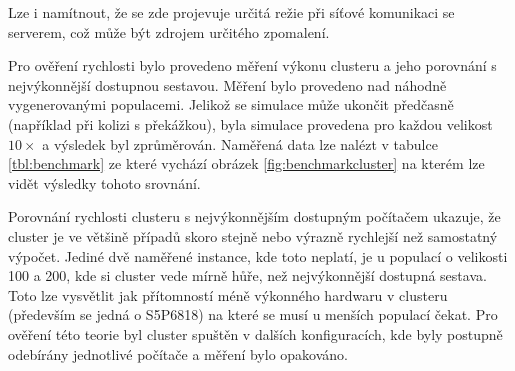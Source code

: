 Lze i namítnout, že se zde projevuje určitá režie při síťové komunikaci se serverem, což může být zdrojem určitého zpomalení.

Pro ověření rychlosti bylo provedeno měření výkonu clusteru a jeho porovnání s nejvýkonnější dostupnou sestavou. Měření bylo provedeno nad náhodně vygenerovanými populacemi. Jelikož se simulace může ukončit předčasně (například při kolizi s překážkou), byla simulace provedena pro každou velikost $10\times$ a výsledek byl zprůměrován. Naměřená data lze nalézt v tabulce \ref{tbl:benchmark} ze které vychází obrázek \ref{fig:benchmarkcluster} na kterém lze vidět výsledky tohoto srovnání. 

Porovnání rychlosti clusteru s nejvýkonnějším dostupným počítačem ukazuje, že cluster je ve většině případů skoro stejně nebo  výrazně rychlejší než samostatný výpočet. Jediné dvě naměřené instance, kde toto neplatí, je u populací o velikosti 100 a 200, kde si cluster vede mírně hůře, než nejvýkonnější dostupná sestava. 
Toto lze vysvětlit jak přítomností méně výkonného hardwaru v clusteru (především se jedná o S5P6818) na které se musí u menších populací čekat. Pro ověření této teorie byl cluster spuštěn v dalších konfiguracích, kde byly postupně odebírány jednotlivé počítače a měření bylo opakováno. 

